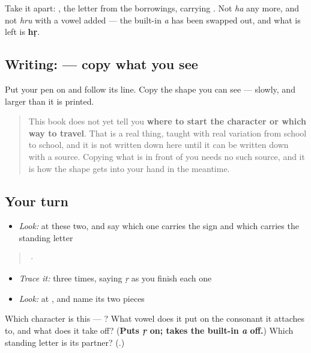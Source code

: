Take it apart: \textbf{}, the letter from the borrowings, carrying \textbf{}. Not \emph{ha} any more, and not \emph{hru} with a vowel added — the built-in \emph{a} has been swapped out, and what is left is \textbf{hṛ}.

\subsection*{Writing:  — copy what you see}
Put your pen on  and follow its line. Copy the shape you can see — slowly, and larger than it is printed.

\begin{quote}
This book does not yet tell you \textbf{where to start the character or which way to travel}. That is a real thing, taught with real variation from school to school, and it is not written down here until it can be written down with a source. Copying what is in front of you needs no such source, and it is how the shape gets into your hand in the meantime.
\end{quote}

\subsection*{Your turn}
\begin{itemize}
\raggedright
  \item \emph{Look:} at these two, and say which one carries the sign and which carries the standing letter
\end{itemize}

\begin{quote}
  ·  
\end{quote}

\begin{itemize}
\raggedright
  \item \emph{Trace it:}  three times, saying \emph{ṛ} as you finish each one
  \item \emph{Look:} at , and name its two pieces
\end{itemize}

\begin{tcolorbox}[breakable,colback=teal!4,colframe=teal!35!black,title={Before you move on}]
Which character is this — ? What vowel does it put on the consonant it attaches to, and what does it take off? (\textbf{Puts \emph{ṛ} on; takes the built-in \emph{a} off.}) Which standing letter is its partner? (\textbf{}.)
\end{tcolorbox}
